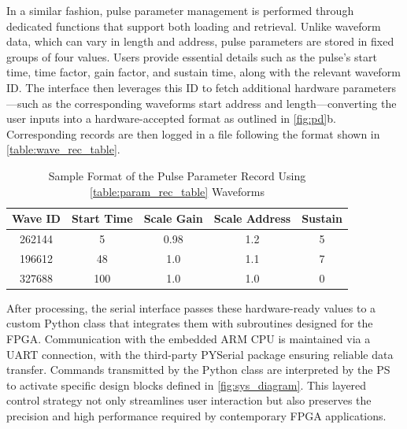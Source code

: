 In a similar fashion, pulse parameter management is performed through dedicated functions that support both loading and retrieval. Unlike waveform data, which can vary in length and address, pulse parameters are stored in fixed groups of four values. Users provide essential details such as the pulse's start time, time factor, gain factor, and sustain time, along with the relevant waveform ID. The interface then leverages this ID to fetch additional hardware parameters—such as the corresponding waveforms start address and length—converting the user inputs into a hardware-accepted format as outlined in \autoref{fig:pd}b. Corresponding records are then logged in a file following the format shown in \autoref{table:wave_rec_table}.

\begin{table}[h]
\centering
\caption{Sample Format of the Pulse Parameter Record Using \autoref{table:param_rec_table} Waveforms}
\label{table:wave_rec_table}
\begin{tabular}{|c|c|c|c|c|}
\hline
Wave ID & Start Time & Scale Gain & Scale Address & Sustain \\
\hline
262144 & 5 & 0.98 & 1.2 & 5\\
\hline
196612 & 48 & 1.0 & 1.1 & 7\\
\hline
327688 & 100 & 1.0 & 1.0 & 0\\
\hline
\end{tabular}
\end{table}

After processing, the serial interface passes these hardware-ready values to a custom Python class that integrates them with subroutines designed for the FPGA. Communication with the embedded ARM CPU is maintained via a UART connection, with the third-party PYSerial package ensuring reliable data transfer. Commands transmitted by the Python class are interpreted by the PS to activate specific design blocks defined in \autoref{fig:sys_diagram}. This layered control strategy not only streamlines user interaction but also preserves the precision and high performance required by contemporary FPGA applications.